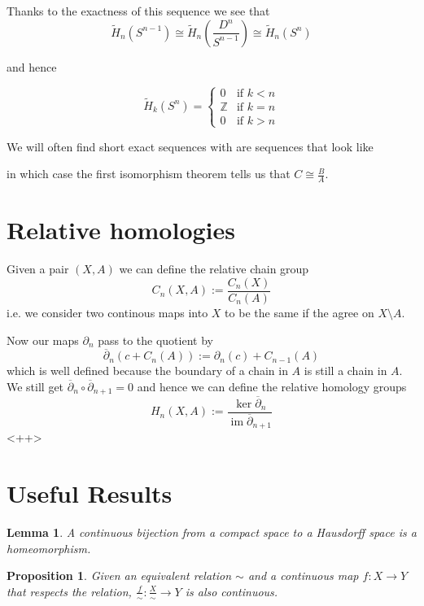 \documentclass[11pt]{article}
\newcommand{\defeq}{:=}
\DeclareMathOperator{\im}{\mathrm{im}}
\newcommand{\Z}{\mathbb{Z}}
\newcommand{\mdf}[1]{{\color{red} #1}}
\newtheorem{lemma}[theorem]{Lemma}
\newtheorem{prop}[theorem]{Proposition}
\begin{document}
Thanks to the exactness of this sequence we see that
\[
	\widetilde{H}_n(S^{n-1})\cong\widetilde{H}_n\left(\frac{D^n}{S^{n-1}}\right)\cong\widetilde{H}_n(S^n)
\]

and hence

\[
	\widetilde{H}_k(S^n)=
	\begin{cases}
		0 & \text{if }k < n \\
		\Z & \text{if }k =n \\
		0 & \text{if }k > n
	\end{cases}
\]

We will often find \mdf{short exact sequences} with are sequences that look like
\begin{figure}[H]
	\centering
\end{figure}

in which case the first isomorphism theorem tells us that $C\cong\frac{B}{A}$.

\section{Relative homologies}
Given a pair $(X, A)$ we can define the \mdf{relative chain group}
\[
	C_n(X, A)\defeq\frac{C_n(X)}{C_n(A)}
\]
i.e. we consider two continous maps into $X$ to be the same if the agree on $X\setminus A$.

Now our maps $\partial_n$ pass to the quotient by
\[
	\overline{\partial}_n(c+C_n(A))\defeq\partial_n(c)+C_{n-1}(A)
\]
which is well defined because the boundary of a chain in $A$ is still a chain in $A$.
We still get $\overline{\partial}_n\circ\overline{\partial}_{n+1}=0$ and hence we can define the \mdf{relative homology groups}
\[
	H_n(X, A)\defeq\frac{\ker\overline{\partial}_n}{\im\overline{\partial}_{n+1}}
\]
<++>

\section{Useful Results}
\begin{lemma}
A continuous bijection from a compact space to a Hausdorff space is a homeomorphism.
\end{lemma}


\begin{prop}
Given an equivalent relation $\sim$ and a continuous map $f:X\to Y$ that respects the relation, $\frac{f}{\sim}:\frac{X}{\sim}\to Y$ is also continuous.
\end{prop}
\end{document}
